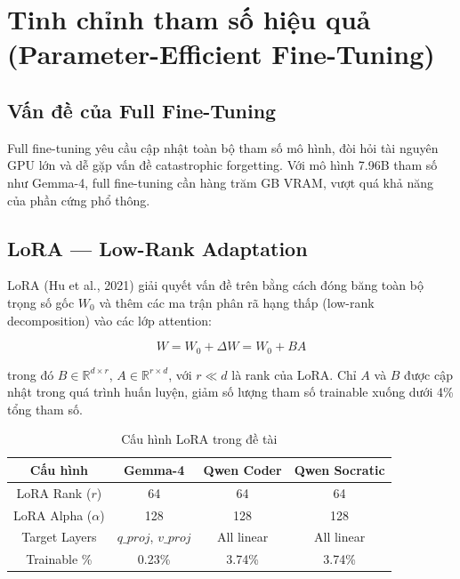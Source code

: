 \section{Tinh chỉnh tham số hiệu quả (Parameter-Efficient Fine-Tuning)}

\subsection{Vấn đề của Full Fine-Tuning}

Full fine-tuning yêu cầu cập nhật toàn bộ tham số mô hình, đòi hỏi tài nguyên GPU lớn và dễ gặp vấn đề catastrophic forgetting. Với mô hình 7.96B tham số như Gemma-4, full fine-tuning cần hàng trăm GB VRAM, vượt quá khả năng của phần cứng phổ thông.

\subsection{LoRA --- Low-Rank Adaptation}

LoRA (Hu et al., 2021) \cite{hu2021lora} giải quyết vấn đề trên bằng cách đóng băng toàn bộ trọng số gốc $W_0$ và thêm các ma trận phân rã hạng thấp (low-rank decomposition) vào các lớp attention:

\begin{equation}
    W = W_0 + \Delta W = W_0 + BA
\end{equation}

trong đó $B \in \mathbb{R}^{d \times r}$, $A \in \mathbb{R}^{r \times d}$, với $r \ll d$ là rank của LoRA. Chỉ $A$ và $B$ được cập nhật trong quá trình huấn luyện, giảm số lượng tham số trainable xuống dưới 4\% tổng tham số.

\begin{table}[h]
\centering
\renewcommand{\arraystretch}{1.3}
\caption{Cấu hình LoRA trong đề tài}
\label{tab:lora_config}
\begin{tabular}{|c|c|c|c|}
\hline
\textbf{Cấu hình} & \textbf{Gemma-4} & \textbf{Qwen Coder} & \textbf{Qwen Socratic} \\
\hline
LoRA Rank ($r$) & 64 & 64 & 64 \\
\hline
LoRA Alpha ($\alpha$) & 128 & 128 & 128 \\
\hline
Target Layers & $q\_proj$, $v\_proj$ & All linear & All linear \\
\hline
Trainable \% & 0.23\% & 3.74\% & 3.74\% \\
\hline
\end{tabular}
\end{table}


